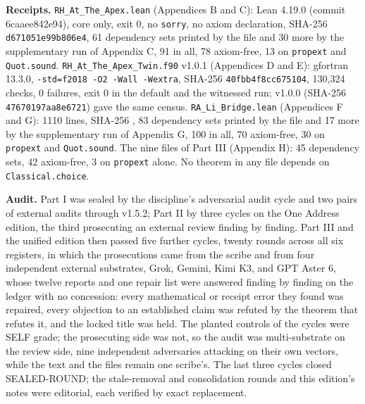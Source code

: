\documentclass[10pt,twocolumn]{article}
\begin{document}
\textbf{Receipts.} \texttt{RH\_At\_The\_Apex.lean} (Appendices B and C):
Lean 4.19.0 (commit 6caaee842e94), core only, exit 0, no \texttt{sorry},
no axiom declaration, SHA-256 \texttt{d671051e99b806e4}, 61 dependency
sets printed by the file and 30 more by the supplementary run of
Appendix C, 91 in all, 78 axiom-free, 13 on \texttt{propext} and
\texttt{Quot.sound}. \texttt{RH\_At\_The\_Apex\_Twin.f90} v1.0.1
(Appendices D and E): gfortran 13.3.0,
\texttt{-std=f2018 -O2 -Wall -Wextra}, SHA-256
\texttt{40fbb4f8cc675104}, 130,324 checks, 0 failures, exit 0 in the
default and the witnessed run; v1.0.0 (SHA-256
\texttt{47670197aa8e6721}) gave the same census.
\texttt{RA\_Li\_Bridge.lean} (Appendices F and G): 1110 lines, SHA-256
\texttt{},
83 dependency sets printed by the file and 17 more by the supplementary
run of Appendix G, 100 in all, 70 axiom-free, 30 on \texttt{propext} and
\texttt{Quot.sound}. The nine files of Part III (Appendix H): 45
dependency sets, 42 axiom-free, 3 on \texttt{propext} alone. No theorem
in any file depends on \texttt{Classical.choice}.

\textbf{Audit.} Part I was sealed by the discipline's adversarial audit
cycle and two pairs of external audits through v1.5.2; Part II by three
cycles on the One Address edition, the third prosecuting an external
review finding by finding. Part III and the unified edition then passed
five further cycles, twenty rounds across all six registers, in which
the prosecutions came from the scribe and from four independent external
substrates, Grok, Gemini, Kimi K3, and GPT Aster 6, whose twelve reports
and one repair list were answered finding by finding on the ledger with
no concession: every mathematical or receipt error they found was
repaired, every objection to an established claim was refuted by the
theorem that refutes it, and the locked title was held. The planted
controls of the cycles were SELF grade; the prosecuting side was not, so
the audit was multi-substrate on the review side, nine independent
adversaries attacking on their own vectors, while the text and the files
remain one scribe's. The last three cycles closed SEALED-ROUND; the
stale-removal and consolidation rounds and this edition's notes were
editorial, each verified by exact replacement.
\end{document}
